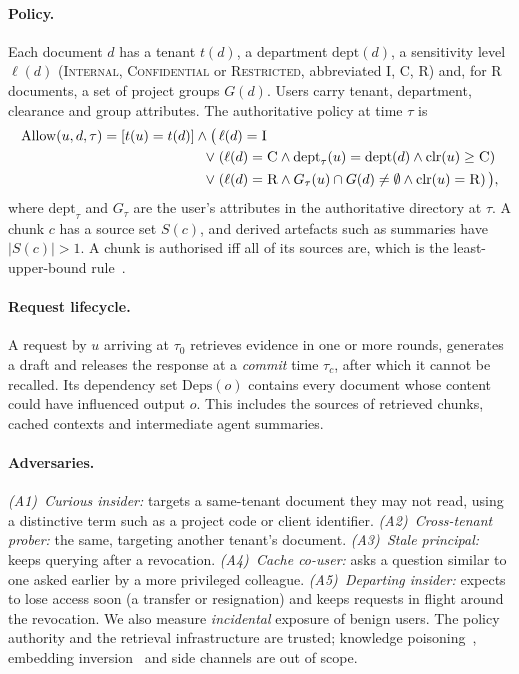\documentclass[10pt]{article}
\begin{document}
\paragraph{Policy.}
Each document $d$ has a tenant $t(d)$, a department $\mathrm{dept}(d)$, a sensitivity level $\ell(d)$ (\textsc{Internal}, \textsc{Confidential} or \textsc{Restricted}, abbreviated \textsc{I}, \textsc{C}, \textsc{R}) and, for \textsc{R} documents, a set of project groups $G(d)$. Users carry tenant, department, clearance and group attributes. The authoritative policy at time $\tau$ is
\begin{equation}
\begin{aligned}
\mathrm{Allow}(u,d,\tau) = [t(u)=t(d)] \wedge \big(\, & \ell(d)=\textsc{I}\\
\vee\; & (\ell(d)=\textsc{C} \wedge \mathrm{dept}_\tau(u)=\mathrm{dept}(d) \wedge \mathrm{clr}(u)\ge \textsc{C})\\
\vee\; & (\ell(d)=\textsc{R} \wedge G_\tau(u)\cap G(d)\neq\emptyset \wedge \mathrm{clr}(u)=\textsc{R})\,\big),
\end{aligned}
\end{equation}
where $\mathrm{dept}_\tau$ and $G_\tau$ are the user's attributes in the authoritative directory at $\tau$. A chunk $c$ has a source set $S(c)$, and derived artefacts such as summaries have $|S(c)|>1$. A chunk is authorised iff all of its sources are, which is the least-upper-bound rule~\cite{denning1976}.

\paragraph{Request lifecycle.}
A request by $u$ arriving at $\tau_0$ retrieves evidence in one or more rounds, generates a draft and releases the response at a \emph{commit} time $\tau_c$, after which it cannot be recalled. Its dependency set $\mathrm{Deps}(o)$ contains every document whose content could have influenced output $o$. This includes the sources of retrieved chunks, cached contexts and intermediate agent summaries.

\paragraph{Adversaries.}
\emph{(A1)~Curious insider:} targets a same-tenant document they may not read, using a distinctive term such as a project code or client identifier. \emph{(A2)~Cross-tenant prober:} the same, targeting another tenant's document. \emph{(A3)~Stale principal:} keeps querying after a revocation. \emph{(A4)~Cache co-user:} asks a question similar to one asked earlier by a more privileged colleague. \emph{(A5)~Departing insider:} expects to lose access soon (a transfer or resignation) and keeps requests in flight around the revocation. We also measure \emph{incidental} exposure of benign users. The policy authority and the retrieval infrastructure are trusted; knowledge poisoning~\cite{zou2025poisonedrag}, embedding inversion~\cite{morris2023} and side channels are out of scope.
\end{document}
